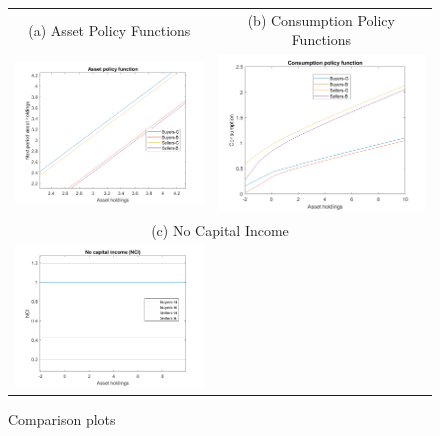 \begin{figure}[H]
\caption{Comparison plots}
\hspace{-2.0cm}
\begin{center}
\begin{tabular}{cc}
\multicolumn{1}{c}{(a) Asset Policy Functions} &  
\multicolumn{1}{c}{(b) Consumption Policy Functions} \\
\includegraphics[angle=0,width=.5\textwidth]{figures/FIG11.png}   & 
\includegraphics[angle=0,width=.5\textwidth]{figures/FIG12.png}\\ 
\multicolumn{2}{c}{(c) No Capital Income} \\  
\includegraphics[angle=0,width=.5\textwidth]{figures/FIG13.png} 
\end{tabular}
\end{center}
\label{fig:5}
\end{figure}

